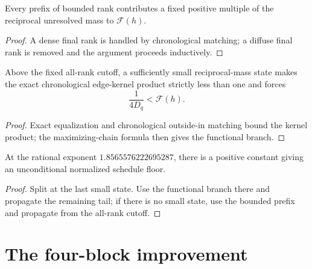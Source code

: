 \begin{theorem}
  \label{thm:bounded-rank}
  \leanok
  Every prefix of bounded rank contributes a fixed positive multiple of the
  reciprocal unresolved mass to $\mathcal F(h)$.
\end{theorem}

\begin{proof}
  \leanok
  A dense final rank is handled by chronological matching; a diffuse final
  rank is removed and the argument proceeds inductively.
\end{proof}

\begin{theorem}
  \label{thm:exact-envelope-small-state}
  \leanok
  Above the fixed all-rank cutoff, a sufficiently small reciprocal-mass state
  makes the exact chronological edge-kernel product strictly less than one
  and forces
  \[
    \frac{1}{4D_q}<\mathcal F(h).
  \]
\end{theorem}

\begin{proof}
  \leanok
  Exact equalization and chronological outside-in matching bound the kernel
  product; the maximizing-chain formula then gives the functional branch.
\end{proof}

\begin{theorem}
  \label{thm:exact-envelope-floor}
  \leanok
  At the rational exponent
  $1.8565576222695287$, there is a positive constant giving an unconditional
  normalized schedule floor.
\end{theorem}

\begin{proof}
  \leanok
  Split at the last small state.  Use the functional branch there and
  propagate the remaining tail; if there is no small state, use the bounded
  prefix and propagate from the all-rank cutoff.
\end{proof}

\chapter{The four-block improvement}

